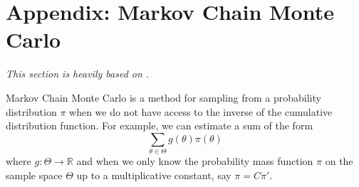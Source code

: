 \documentclass{article}
\begin{document}

\FloatBarrier
\printbibliography

\appendix

\section{Appendix: Markov Chain Monte Carlo}\label{app:mcmc}
\textit{This section is heavily based on \cite{grimmett2020probability}.}

Markov Chain Monte Carlo is a method for sampling from a probability distribution \(\pi\) when we do not have access to the inverse of the cumulative distribution function. For example, we can estimate a sum of the form
\begin{equation}\label{eq:mcmc-expectation}
    \sum_{\theta \in \Theta} g(\theta) \pi(\theta)
\end{equation}
where \(g : \Theta \to \mathbb{R}\) and when we only know the probability mass function \(\pi\) on the sample space \(\Theta\) up to a multiplicative constant, say \(\pi = C \pi'\).
\end{document}
